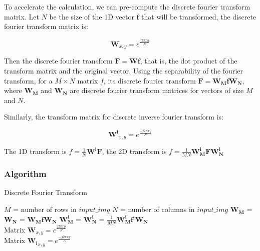 \documentclass{article}
\begin{document}
To accelerate the calculation, we can pre-compute the discrete fourier transform  matrix. Let $N$ be the size of the 1D vector $\mathbf{f}$ that will be transformed, the discrete fourier transform matrix is:

$$\mathbf{W}_{x,y} = e^{\frac{j2\pi xy}{N}}$$

Then the discrete fourier transform $\mathbf{F} = \mathbf{W} \mathbf{f}$, that is, the dot product of the transform matrix and the original vector. Using the separability of the fourier transform, for a $M \times N$ matrix $f$, its discrete fourier transform $\mathbf{F} = \mathbf{W_M} \mathbf{f} \mathbf{W_N}$, where $\mathbf{W_M}$ and $\mathbf{W_N}$ are discrete fourier transform matrices for vectors of size $M$ and $N$.

Similarly, the transform matrix for discrete inverse fourier transform is:

$$\mathbf{W^i}_{x,y} = e^{\frac{-j2\pi xy}{N}}$$

The 1D transform is $f = \frac{1}{N} \mathbf{W^i} \mathbf{F}$, the 2D transform is $f = \frac{1}{MN} \mathbf{W^i_M} \mathbf{F} \mathbf{W^i_N}$


\subsubsection{Algorithm}

\begin{algorithm}[H]
\centering
\caption{Discrete Fourier Transform}
  \begin{algorithmic}[1]
      \State $M$ = number of rows in $input\_img$
      \State $N$ = number of columns in $input\_img$
	      \State $\mathbf{W_M}$ = 
	      \State $\mathbf{W_N}$ = 
	      \State \Return $\mathbf{W_M} \mathbf{f} \mathbf{W_N}$
      \Else
	      \State $\mathbf{W^i_M}$ = 
	      \State $\mathbf{W^i_N}$ = 
	      \State \Return $\frac{1}{MN} \mathbf{W^i_M} \mathbf{f} \mathbf{^iW_N}$
      \EndIf
    \EndFunction
    \\
      \State \Return Matrix $\mathbf{W}_{x,y} = e^{\frac{j2\pi xy}{N}}$
    \EndFunction
    \\
      \State \Return Matrix $\mathbf{W_i}_{x,y} = e^{\frac{-j2\pi xy}{N}}$
    \EndFunction
  \end{algorithmic}
\end{algorithm}
\end{document}
